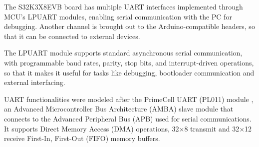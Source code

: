 \documentclass{article}
\begin{document}
The S32K3X8EVB board has multiple UART interfaces implemented through MCU’s
LPUART modules, enabling
serial communication with the PC for debugging. 
Another channel is brought out to the Arduino-compatible
headers, so that it can be connected to external devices.

The LPUART module supports standard asynchronous serial communication, with
programmable baud rates, parity, stop bits, and interrupt-driven operations, so that it makes it useful for tasks like debugging,
bootloader communication and external interfacing.

UART functionalities were modeled after the PrimeCell UART (PL011) module \cite{arm-pl011-0183G}, an Advanced Microcontroller Bus Architecture (AMBA) slave module that connects to the Advanced Peripheral Bus (APB) used for serial communications. It supports Direct Memory Access (DMA) operations, 32×8 transmit and 32×12 receive First-In, First-Out (FIFO) memory buffers.
\end{document}
